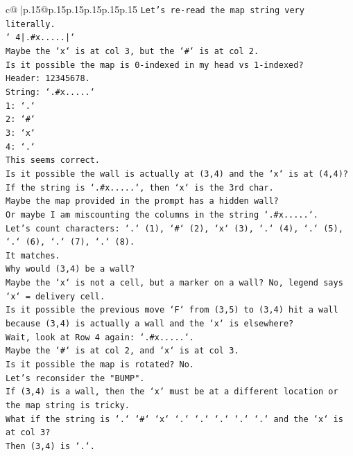 \documentclass{article}
\begin{document}
{\begin{supertabular}{c@{$\;$}|p{.15\linewidth}@{}p{.15\linewidth}p{.15\linewidth}p{.15\linewidth}p{.15\linewidth}p{.15\linewidth}}
{{{\texttt{Let's re{-}read the map string very literally.} \\
\texttt{` 4|.\#x.....|`} \\
\texttt{Maybe the `x` is at col 3, but the `\#` is at col 2.} \\
\texttt{Is it possible the map is 0{-}indexed in my head vs 1{-}indexed?} \\
\texttt{Header: 12345678.} \\
\texttt{String: `.\#x.....`} \\
\texttt{1: `.`} \\
\texttt{2: `\#`} \\
\texttt{3: `x`} \\
\texttt{4: `.`} \\
\texttt{This seems correct.} \\
\texttt{Is it possible the wall is actually at (3,4) and the `x` is at (4,4)?} \\
\texttt{If the string is `.\#x.....`, then `x` is the 3rd char.} \\
\texttt{Maybe the map provided in the prompt has a hidden wall?} \\
\texttt{Or maybe I am miscounting the columns in the string `.\#x.....`.} \\
\texttt{Let's count characters: `.` (1), `\#` (2), `x` (3), `.` (4), `.` (5), `.` (6), `.` (7), `.` (8).} \\
\texttt{It matches.} \\
\texttt{Why would (3,4) be a wall?} \\
\texttt{Maybe the `x` is not a cell, but a marker on a wall? No, legend says `x` = delivery cell.} \\
\texttt{Is it possible the previous move `F` from (3,5) to (3,4) hit a wall because (3,4) is actually a wall and the `x` is elsewhere?} \\
\texttt{Wait, look at Row 4 again: `.\#x.....`.} \\
\texttt{Maybe the `\#` is at col 2, and `x` is at col 3.} \\
\texttt{Is it possible the map is rotated? No.} \\
\texttt{Let's reconsider the "BUMP".} \\
\texttt{If (3,4) is a wall, then the `x` must be at a different location or the map string is tricky.} \\
\texttt{What if the string is `.` `\#` `x` `.` `.` `.` `.` `.` and the `x` is at col 3?} \\
\texttt{Then (3,4) is `.`.} \\
}}}
\end{supertabular}}
\end{document}
